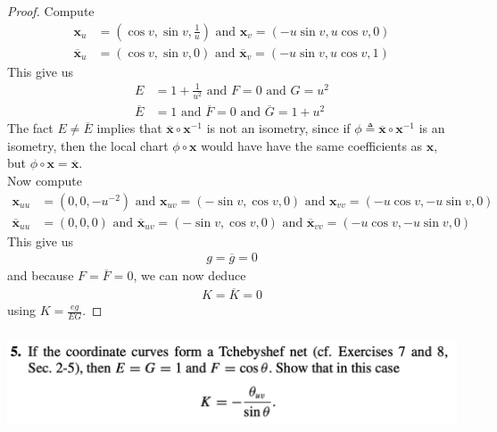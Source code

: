 \documentclass{report}
\begin{document}
\begin{proof}
Compute 
\begin{align*}
\textbf{x}_u&= (\cos v, \sin v, \frac{1}{u})\text{ and }\textbf{x}_v=(-u \sin v,u \cos v ,0)\\
\overline{\textbf{x}}_u&= (\cos v, \sin v, 0)\text{ and }\overline{\textbf{x}}_v=(-u \sin v,u \cos v,1)
\end{align*}
This give us 
\begin{align*}
E&=1+\frac{1}{u^2}\text{ and }F=0\text{ and }G=u^2\\
\overline{E}&=1\text{ and }\overline{F}=0 \text{ and }\overline{G}=1+u^2
\end{align*}
The fact $E\neq \overline{E}$ implies that $\overline{\textbf{x}}\circ \textbf{x}^{-1}$ is not an isometry, since if $\phi\triangleq \overline{\textbf{x}}\circ \textbf{x}^{-1}$ is an isometry, then the local chart $\phi \circ \textbf{x}$ would have have the same coefficients as $\textbf{x}$, but $\phi\circ \textbf{x}=\overline{\textbf{x}}$.\\

Now compute 
\begin{align*}
\textbf{x}_{uu}&= (0,0, -u^{-2})\text{ and }\textbf{x}_{uv}=(-\sin v, \cos v,0)\text{ and }\textbf{x}_{vv}=(-u \cos v, - u \sin v,0)\\
\overline{\textbf{x}}_{uu}&=(0,0,0)\text{ and }\overline{\textbf{x}}_{uv}=(-\sin v, \cos v,0)\text{ and }\overline{\textbf{x}}_{vv}= (-u \cos v, -u \sin v,0)
\end{align*}
This give us 
\begin{align*}
g=\overline{g}=0
\end{align*}
and because $F=\overline{F}=0$, we can now deduce 
\begin{align*}
K=\overline{K}=0
\end{align*}
using $K=\frac{eg}{EG}$.
\end{proof}
\begin{question}{}{}
\includegraphics[height=3cm,width=18cm]{hw610}
\end{question}
\end{document}
